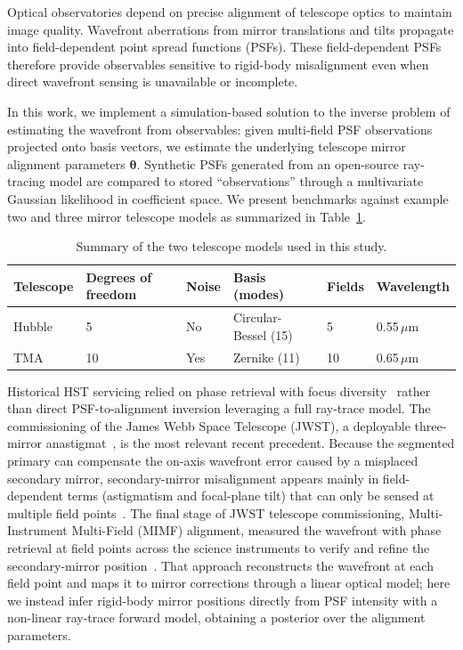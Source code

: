 \documentclass[fleqn,usenatbib]{rasti}
\begin{document}
Optical observatories depend on precise alignment of telescope optics to maintain image quality. Wavefront aberrations from mirror translations and tilts propagate into field-dependent point spread functions (PSFs). These field-dependent PSFs therefore provide observables sensitive to rigid-body misalignment even when direct wavefront sensing is unavailable or incomplete.

In this work, we implement a simulation-based solution to the inverse problem of estimating the wavefront from observables: given multi-field PSF observations projected onto basis vectors, we estimate the underlying telescope mirror alignment parameters $\boldsymbol{\theta}$. Synthetic PSFs generated from an open-source ray-tracing model are compared to stored ``observations'' through a multivariate Gaussian likelihood in coefficient space. We present benchmarks against example two and three mirror telescope models as summarized in Table~\ref{tab:summary}.

\begin{table}
\centering
\caption{Summary of the two telescope models used in this study.}
\label{tab:summary}
\begin{tabular}{llllll}
\hline
Telescope & Degrees of freedom & Noise & Basis (modes) & Fields & Wavelength \\
\hline
Hubble & 5  & No  & Circular-Bessel (15) & 5  & 0.55\,$\mu$m \\
TMA    & 10 & Yes & Zernike (11) & 10 & 0.65\,$\mu$m \\
\hline
\end{tabular}
\end{table}

Historical HST servicing relied on phase retrieval with focus diversity~\citep{Fienup1982,Lofgren2014,Krist1997} rather than direct PSF-to-alignment inversion leveraging a full ray-trace model. The commissioning of the James Webb Space Telescope (JWST),  a deployable three-mirror anastigmat~\citep{Knight2012}, is the most relevant recent precedent. Because the segmented primary can compensate the on-axis wavefront error caused by a misplaced secondary mirror, secondary-mirror misalignment appears mainly in field-dependent terms (astigmatism and focal-plane tilt) that can only be sensed at multiple field points~\citep{ActonKnight2012}. The final stage of JWST telescope commissioning, Multi-Instrument Multi-Field (MIMF) alignment, measured the wavefront with phase retrieval at field points across the science instruments to verify and refine the secondary-mirror position~\citep{Acton2022,McElwain2023}. That approach reconstructs the wavefront at each field point and maps it to mirror corrections through a linear optical model; here we instead infer rigid-body mirror positions directly from PSF intensity with a non-linear ray-trace forward model, obtaining a posterior over the alignment parameters.
\end{document}
